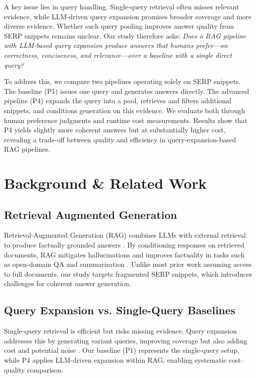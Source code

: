 \documentclass[manuscript,screen]{acmart}
\begin{document}
\begin{CCSXML}
A key issue lies in query handling. Single-query retrieval often misses relevant evidence, while LLM-driven query expansion promises broader coverage and more diverse evidence. Whether such query pooling improves answer quality from SERP snippets remains unclear. Our study therefore asks:  
\emph{Does a RAG pipeline with LLM-based query expansion produce answers that humans prefer—on correctness, conciseness, and relevance—over a baseline with a single direct query?}

To address this, we compare two pipelines operating solely on SERP snippets. The baseline (P1) issues one query and generates answers directly. The advanced pipeline (P4) expands the query into a pool, retrieves and filters additional snippets, and conditions generation on this evidence. We evaluate both through human preference judgments and runtime cost measurements. Results show that P4 yields slightly more coherent answers but at substantially higher cost, revealing a trade-off between quality and efficiency in query-expansion-based RAG pipelines.

\section{Background \& Related Work}
\label{sec:background}

	\subsection{Retrieval Augmented Generation}
	\label{subsec:retrieval-augmented-generation}
	Retrieval-Augmented Generation (RAG) combines LLMs with external retrieval to produce factually grounded answers \cite{izacard-grave-2021-leveraging,NEURIPS2020_6b493230}. By conditioning responses on retrieved documents, RAG mitigates hallucinations and improves factuality in tasks such as open-domain QA and summarization \cite{karpukhin-etal-2020-dense,guu2020realmretrievalaugmentedlanguagemodel}. Unlike most prior work assuming access to full documents, our study targets fragmented SERP snippets, which introduces challenges for coherent answer generation.
	
	\subsection{Query Expansion vs. Single-Query Baselines}
	\label{subsec:query-expansion-vs-baseline}
	Single-query retrieval is efficient but risks missing evidence. Query expansion addresses this by generating variant queries, improving coverage but also adding cost and potential noise \cite{nogueira2020passagererankingbert,wang-etal-2023-query2doc}. Our baseline (P1) represents the single-query setup, while P4 applies LLM-driven expansion within RAG, enabling systematic cost–quality comparison.
	

\end{CCSXML}
\end{document}
